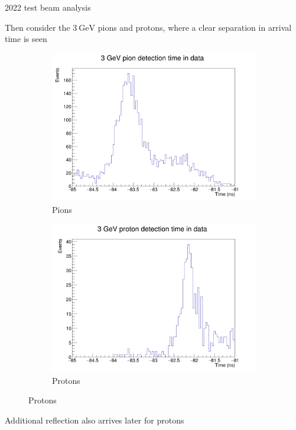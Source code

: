 \documentclass[xcolor={dvipsnames}]{beamer}
\begin{document}
\begin{frame}{2022 test beam analysis}
  \begin{center}
    \Large{Then consider the $\SI{3}{\giga\eV}$ pions and protons, where a clear separation in arrival time is seen}
  \end{center}
  \begin{figure}
    \centering
    \begin{subfigure}{0.5\textwidth}
      \includegraphics[width = 1.0\textwidth]{Figs/Time_Pos8_Pion_3GeV_Data.png}
      \caption{Pions}
    \end{subfigure}%
    \begin{subfigure}{0.5\textwidth}
      \includegraphics[width = 1.0\textwidth]{Figs/Time_Pos8_Proton_3GeV_Data.png}
      \caption{Protons}
    \end{subfigure}%
  \end{figure}
  \begin{center}
    Additional reflection also arrives later for protons\phantom{(}
  \end{center}
\end{frame}
\end{document}
